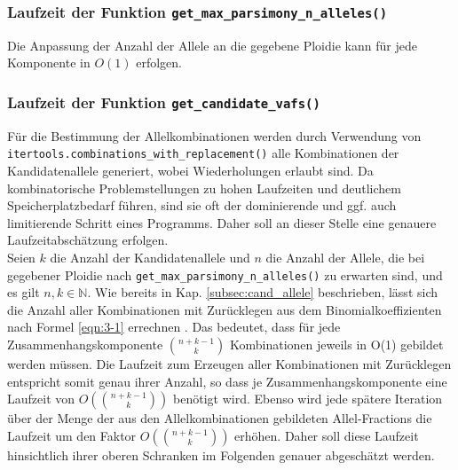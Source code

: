 \subsubsection{Laufzeit der Funktion \lstinline|get_max_parsimony_n_alleles()|}
Die Anpassung der Anzahl der Allele an die gegebene Ploidie kann für jede Komponente in $ O(1) $ erfolgen.\\

\subsubsection{Laufzeit der Funktion \lstinline|get_candidate_vafs()|} \label{subsubsec:cand_vafs}
Für die Bestimmung der Allelkombinationen werden durch Verwendung von \linebreak \lstinline|itertools.combinations_with_replacement()| alle Kombinationen der Kandidatenallele generiert, wobei Wiederholungen erlaubt sind. Da kombinatorische Problemstellungen zu hohen Laufzeiten und deutlichem Speicherplatzbedarf führen, sind sie oft der dominierende und ggf. auch limitierende Schritt eines Programms. Daher soll an dieser Stelle eine genauere Laufzeitabschätzung erfolgen. \\

Seien $k$ die Anzahl der Kandidatenallele und $n$ die Anzahl der Allele, die bei gegebener Ploidie nach \lstinline|get_max_parsimony_n_alleles()| zu erwarten sind, und es gilt $n, k \in \mathds{N} $.  Wie bereits in Kap. \ref{subsec:cand_allele} beschrieben, lässt sich die Anzahl aller Kombinationen mit Zurücklegen aus dem Binomialkoeffizienten nach  Formel \eqref{eqn:3-1} errechnen \cite{tb_stat}. Das bedeutet, dass für jede Zusammenhangskomponente $ \binom{n + k - 1}{k} $ Kombinationen jeweils in O(1) gebildet werden müssen. Die Laufzeit zum Erzeugen aller Kombinationen mit Zurücklegen entspricht somit genau ihrer Anzahl, so dass je Zusammenhangskomponente eine Laufzeit von $ O(\binom{n + k - 1}{k}) $ benötigt wird. Ebenso wird jede spätere Iteration über der Menge der aus den Allelkombinationen gebildeten Allel-Fractions die Laufzeit um den Faktor $ O(\binom{n + k - 1}{k}) $ erhöhen. Daher soll diese Laufzeit hinsichtlich ihrer oberen Schranken im Folgenden genauer abgeschätzt werden. \\

